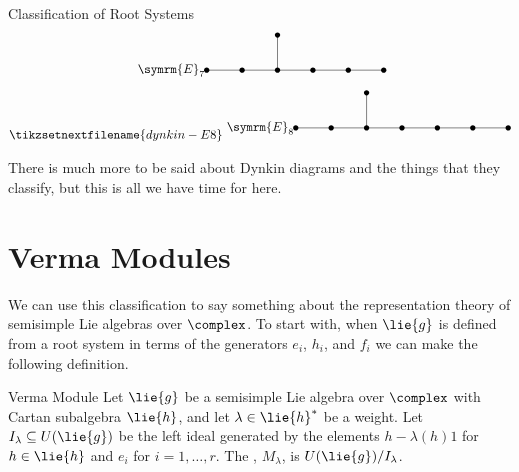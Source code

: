\documentclass[fleqn]{NotesClass}
\newcommand{\dynkin}[2]{\symrm{#1}_{#2}}
\begin{document}
\begin{thm}{Classification of Root Systems}{}
\begin{gather}
            \begin{tikzpicture}
                \node at (-1, 0) {\(\dynkin{E}{7}\)};
                \fill (0, 0) circle [radius=0.075cm];
                \fill (1, 0) circle [radius=0.075cm];
                \fill (2, 0) circle [radius=0.075cm];
                \fill (3, 0) circle [radius=0.075cm];
                \fill (4, 0) circle [radius=0.075cm];
                \fill (5, 0) circle [radius=0.075cm];
                \fill (2, 1) circle [radius=0.075cm];
                \draw (0, 0) -- (5, 0);
                \draw (2, 0) -- (2, 1);
            \end{tikzpicture}
            \\
            \tikzsetnextfilename{dynkin-E8}
            \begin{tikzpicture}
                \node at (-1, 0) {\(\dynkin{E}{8}\)};
                \fill (0, 0) circle [radius=0.075cm];
                \fill (1, 0) circle [radius=0.075cm];
                \fill (2, 0) circle [radius=0.075cm];
                \fill (3, 0) circle [radius=0.075cm];
                \fill (4, 0) circle [radius=0.075cm];
                \fill (5, 0) circle [radius=0.075cm];
                \fill (6, 0) circle [radius=0.075cm];
                \fill (2, 1) circle [radius=0.075cm];
                \draw (0, 0) -- (6, 0);
                \draw (2, 0) -- (2, 1);
            \end{tikzpicture}
        \end{gather}
    \end{thm}
    
    There is much more to be said about Dynkin diagrams and the things that they classify, but this is all we have time for here.
    
    \section{Verma Modules}
    We can use this classification to say something about the representation theory of semisimple Lie algebras over \(\complex\).
    To start with, when \(\lie{g}\) is defined from a root system in terms of the generators \(e_i\), \(h_i\), and \(f_i\) we can make the following definition.
    
    \begin{dfn}{Verma Module}{}
        Let \(\lie{g}\) be a semisimple Lie algebra over \(\complex\) with Cartan subalgebra \(\lie{h}\), and let \(\lambda \in \lie{h}^*\) be a weight.
        Let \(I_\lambda \subseteq U(\lie{g})\) be the left ideal generated by the elements \(h - \lambda(h)1\) for \(h \in \lie{h}\) and \(e_i\) for \(i = 1, \dotsc, r\).
        The , \(M_\lambda\), is \(U(\lie{g}) / I_\lambda\).
    \end{dfn}
    
\end{document}
